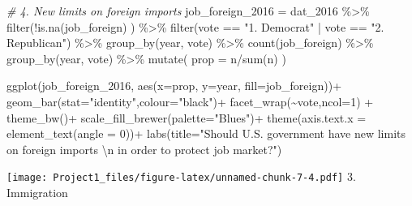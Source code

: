 \documentclass[
]{article}
\newenvironment{Shaded}{\begin{snugshade}}{\end{snugshade}}
\newcommand{\AttributeTok}[1]{\textcolor[rgb]{0.77,0.63,0.00}{#1}}
\newcommand{\CommentTok}[1]{\textcolor[rgb]{0.56,0.35,0.01}{\textit{#1}}}
\newcommand{\DecValTok}[1]{\textcolor[rgb]{0.00,0.00,0.81}{#1}}
\newcommand{\FunctionTok}[1]{\textcolor[rgb]{0.00,0.00,0.00}{#1}}
\newcommand{\NormalTok}[1]{#1}
\newcommand{\OtherTok}[1]{\textcolor[rgb]{0.56,0.35,0.01}{#1}}
\newcommand{\SpecialCharTok}[1]{\textcolor[rgb]{0.00,0.00,0.00}{#1}}
\newcommand{\StringTok}[1]{\textcolor[rgb]{0.31,0.60,0.02}{#1}}
\begin{document}
\begin{Shaded}
\begin{Highlighting}[]
\CommentTok{\# 4. New limits on foreign imports}
\NormalTok{job\_foreign\_2016 }\OtherTok{=}\NormalTok{ dat\_2016 }\SpecialCharTok{\%\textgreater{}\%}
  \FunctionTok{filter}\NormalTok{(}\SpecialCharTok{!}\FunctionTok{is.na}\NormalTok{(job\_foreign) ) }\SpecialCharTok{\%\textgreater{}\%}
  \FunctionTok{filter}\NormalTok{(vote }\SpecialCharTok{==} \StringTok{"1. Democrat"} \SpecialCharTok{|}\NormalTok{ vote }\SpecialCharTok{==} \StringTok{"2. Republican"}\NormalTok{) }\SpecialCharTok{\%\textgreater{}\%}
  \FunctionTok{group\_by}\NormalTok{(year, vote) }\SpecialCharTok{\%\textgreater{}\%}
  \FunctionTok{count}\NormalTok{(job\_foreign) }\SpecialCharTok{\%\textgreater{}\%}
  \FunctionTok{group\_by}\NormalTok{(year, vote) }\SpecialCharTok{\%\textgreater{}\%}
  \FunctionTok{mutate}\NormalTok{(}
    \AttributeTok{prop =}\NormalTok{ n}\SpecialCharTok{/}\FunctionTok{sum}\NormalTok{(n)}
\NormalTok{  )}

\FunctionTok{ggplot}\NormalTok{(job\_foreign\_2016,}
       \FunctionTok{aes}\NormalTok{(}\AttributeTok{x=}\NormalTok{prop, }\AttributeTok{y=}\NormalTok{year, }\AttributeTok{fill=}\NormalTok{job\_foreign))}\SpecialCharTok{+}
  \FunctionTok{geom\_bar}\NormalTok{(}\AttributeTok{stat=}\StringTok{"identity"}\NormalTok{,}\AttributeTok{colour=}\StringTok{"black"}\NormalTok{)}\SpecialCharTok{+}
  \FunctionTok{facet\_wrap}\NormalTok{(}\SpecialCharTok{\textasciitilde{}}\NormalTok{vote,}\AttributeTok{ncol=}\DecValTok{1}\NormalTok{) }\SpecialCharTok{+}
  \FunctionTok{theme\_bw}\NormalTok{()}\SpecialCharTok{+}
  \FunctionTok{scale\_fill\_brewer}\NormalTok{(}\AttributeTok{palette=}\StringTok{"Blues"}\NormalTok{)}\SpecialCharTok{+}
  \FunctionTok{theme}\NormalTok{(}\AttributeTok{axis.text.x =} \FunctionTok{element\_text}\NormalTok{(}\AttributeTok{angle =} \DecValTok{0}\NormalTok{))}\SpecialCharTok{+}
  \FunctionTok{labs}\NormalTok{(}\AttributeTok{title=}\StringTok{"Should U.S. government have new limits on foreign imports }\SpecialCharTok{\textbackslash{}n}\StringTok{ in order to protect job market?"}\NormalTok{)}
\end{Highlighting}
\end{Shaded}

\texttt{[image: Project1\_files/figure-latex/unnamed-chunk-7-4.pdf]} 3.
Immigration
\end{document}
